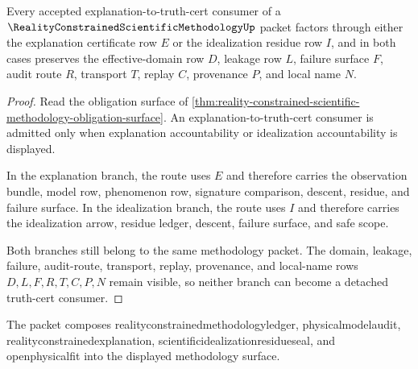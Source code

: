 \begin{theorem}
\label{thm:reality-constrained-scientific-methodology-consumer-factorization}
Every accepted explanation-to-truth-cert consumer of a $\RealityConstrainedScientificMethodologyUp$ packet factors through either the explanation certificate row $E$ or the idealization residue row $I$, and in both cases preserves the effective-domain row $D$, leakage row $L$, failure surface $F$, audit route $R$, transport $T$, replay $C$, provenance $P$, and local name $N$.
\end{theorem}
\begin{proof}
Read the obligation surface of \autoref{thm:reality-constrained-scientific-methodology-obligation-surface}. An explanation-to-truth-cert consumer is admitted only when explanation accountability or idealization accountability is displayed.

In the explanation branch, the route uses $E$ and therefore carries the observation bundle, model row, phenomenon row, signature comparison, descent, residue, and failure surface. In the idealization branch, the route uses $I$ and therefore carries the idealization arrow, residue ledger, descent, failure surface, and safe scope.

Both branches still belong to the same methodology packet. The domain, leakage, failure, audit-route, transport, replay, provenance, and local-name rows $D,L,F,R,T,C,P,N$ remain visible, so neither branch can become a detached truth-cert consumer.
\end{proof}



The packet composes realityconstrainedmethodologyledger, physicalmodelaudit, realityconstrainedexplanation, scientificidealizationresidueseal, and openphysicalfit into the displayed methodology surface.


